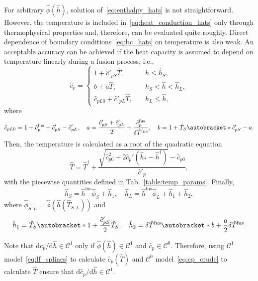 \documentclass{article}
\newcommand{\dd}{\mathrm{d}}
\newcommand{\Der}[2][]{\dd#1/\dd#2}
\DeclarePairedDelimiter\autobracket()       %
\newcommand{\br}[1]{\autobracket*{#1}}
\newcommand{\fusion}[1]{{#1}^\mathrm{fus}}
\begin{document}
For arbitrary \(\hat{\phi}(\hat{h})\), solution of~\eqref{eq:enthalpy_hats} is not straightforward.
However, the temperature is included in~\eqref{eq:heat_conduction_hats} only through thermophysical properties
and, therefore, can be evaluated quite roughly.
Direct dependence of boundary conditions~\eqref{eq:bc_hats} on temperature is also weak.
An acceptable accuracy can be achieved if the heat capacity is assumed
to depend on temperature linearly during a fusion process, i.e.,
\begin{equation}\label{eq:cp_crude}
	\hat{c}_p = \begin{cases}
        1 + \hat{c}'_{pS}\hat{T},             & \quad \hat{h} \leq \hat{h}_S, \\
        b + a\hat{T},                         & \quad \hat{h}_S < \hat{h} < \hat{h}_L, \\
        \hat{c}_{pL0} + \hat{c}'_{pL}\hat{T}, & \quad \hat{h}_L \leq \hat{h},
    \end{cases}
\end{equation}
where
\begin{equation*}
	\hat{c}_{pL0} = 1 + \fusion{\hat{c}_p} + \hat{c}'_{pS} - \hat{c}'_{pL}, \quad
	a = \frac{\hat{c}'_{pS} + \hat{c}'_{pL}}2 + \frac{\fusion{\hat{c}_p}}{\delta\fusion{\hat{T}}}, \quad
	b = 1 + \hat{T}_S\br{ \hat{c}'_{pS} - a }.
\end{equation*}
Then, the temperature is calculated as a root of the quadratic equation
\begin{equation}\label{eq:temp_crude}
	\hat{T} = \hat{T}^\dag + \frac{\sqrt{\hat{c}_{p0}^2 + 2\hat{c}_p'(\hat{h}_* - \hat{h}^\dag) } - \hat{c}_{p0}}{\hat{c}'_p},
\end{equation}
with the piecewise quantities defined in Tab.~\ref{table:temp_params}. Finally,
\begin{equation}\label{eq:enthalpy_crude}
	\hat{h}_S = \fusion{\hat{h}}\hat{\phi}_S + \hat{h}_1, \quad \hat{h}_L = \fusion{\hat{h}}\hat{\phi}_L + \hat{h}_1 + \hat{h}_2,
\end{equation}
where \(\hat{\phi}_{S,L} = \hat{\phi}(\hat{h}(\hat{T}_{S,L}))\) and
\begin{equation*}
	\hat{h}_1 = \hat{T}_S\br{ 1 + \frac{\hat{c}'_{pS}}2\hat{T}_S }, \quad
	\hat{h}_2 = \delta\fusion{\hat{T}}\br{ b + \frac{a}2\delta\fusion{\hat{T}} }.
\end{equation*}

Note that \(\Der[\hat{c}_p]{\hat{h}}\in\mathcal{C}^1\)
only if \(\hat{\phi}(\hat{h})\in\mathcal{C}^1\) and \(\hat{c}_p\in\mathcal{C}^0\).
Therefore, using \(\mathcal{C}^1\) model~\eqref{eq:lf_splines} to calculate \(\hat{c}_p(\hat{T})\)
and \(\mathcal{C}^0\) model~\eqref{eq:cp_crude} to calculate \(\hat{T}\)
ensure that \(\Der[\hat{c}_p]{\hat{h}}\in\mathcal{C}^1\).
\end{document}
